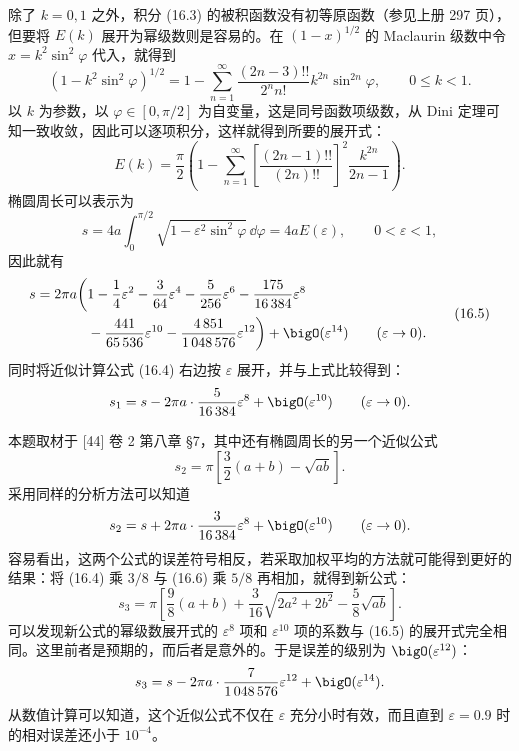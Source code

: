 \begin{xsolution}
除了 $k=0,1$ 之外，积分 (16.3) 的被积函数没有初等原函数（参见上册 297 页），但要将 $E(k)$ 展开为幂级数则是容易的。在 $(1-x)^{1/2}$ 的 Maclaurin 级数中令 $x=k^2\sin^2\varphi$ 代入，就得到
\[
  (1-k^2\sin^2\varphi)^{1/2}
  =1-\sum_{n=1}^{\infty}\frac{(2n-3)!!}{2^n n!}k^{2n}\sin^{2n}\varphi,
  \qquad 0\leqslant k<1.
\]
以 $k$ 为参数，以 $\varphi\in[0,\pi/2]$ 为自变量，这是同号函数项级数，从 Dini 定理可知一致收敛，因此可以逐项积分，这样就得到所要的展开式：
\[
  E(k)=\frac{\pi}{2}\left(1-\sum_{n=1}^{\infty}
  \left[\frac{(2n-1)!!}{(2n)!!}\right]^2\frac{k^{2n}}{2n-1}\right).
\]
椭圆周长可以表示为
\[
  s=4a\int_0^{\pi/2}\sqrt{1-\varepsilon^2\sin^2\varphi}\,\dd\varphi
  =4aE(\varepsilon),\qquad 0<\varepsilon<1,
\]
因此就有
\begin{equation}
\begin{aligned}
  s=2\pi a\biggl(&1-\frac14\varepsilon^2-\frac{3}{64}\varepsilon^4
  -\frac{5}{256}\varepsilon^6-\frac{175}{16\,384}\varepsilon^8\\
  &-\frac{441}{65\,536}\varepsilon^{10}-\frac{4\,851}{1\,048\,576}\varepsilon^{12}\biggr)
  +\bigO(\varepsilon^{14})\qquad(\varepsilon\to0).
\end{aligned}
\tag{16.5}
\label{eq:16.5}
\end{equation}
同时将近似计算公式 (16.4) 右边按 $\varepsilon$ 展开，并与上式比较得到：
\[
  s_1=s-2\pi a\cdot\frac{5}{16\,384}\varepsilon^8+\bigO(\varepsilon^{10})
  \qquad(\varepsilon\to0).
\]
\end{xsolution}

\begin{xremark}
本题取材于 [44] 卷 2 第八章 §7，其中还有椭圆周长的另一个近似公式
\begin{equation}
  s_2=\pi\left[\frac32(a+b)-\sqrt{ab}\right].
\tag{16.6}
\label{eq:16.6}
\end{equation}
采用同样的分析方法可以知道
\[
  s_2=s+2\pi a\cdot\frac{3}{16\,384}\varepsilon^8+\bigO(\varepsilon^{10})
  \qquad(\varepsilon\to0).
\]
容易看出，这两个公式的误差符号相反，若采取加权平均的方法就可能得到更好的结果：将 (16.4) 乘 $3/8$ 与 (16.6) 乘 $5/8$ 再相加，就得到新公式：
\begin{equation}
  s_3=\pi\left[\frac98(a+b)+\frac{3}{16}\sqrt{2a^2+2b^2}-\frac58\sqrt{ab}\right].
\tag{16.7}
\label{eq:16.7}
\end{equation}
可以发现新公式的幂级数展开式的 $\varepsilon^8$ 项和 $\varepsilon^{10}$ 项的系数与 (16.5) 的展开式完全相同。这里前者是预期的，而后者是意外的。于是误差的级别为 $\bigO(\varepsilon^{12})$：
\[
  s_3=s-2\pi a\cdot\frac{7}{1\,048\,576}\varepsilon^{12}+\bigO(\varepsilon^{14}).
\]
从数值计算可以知道，这个近似公式不仅在 $\varepsilon$ 充分小时有效，而且直到 $\varepsilon=0.9$ 时的相对误差还小于 $10^{-4}$。
\end{xremark}

